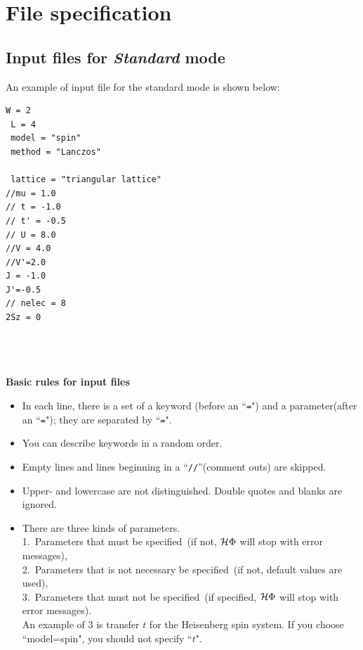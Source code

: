 \chapter{File specification}
\label{Ch:HowToStandard}
\section{Input files for {\it Standard} mode}

An example of input file for the standard mode is shown below:

\begin{minipage}{10cm}
\begin{screen}
\begin{verbatim}
W = 2
 L = 4
 model = "spin"
 method = "Lanczos"

 lattice = "triangular lattice"
//mu = 1.0
// t = -1.0
// t' = -0.5
// U = 8.0
//V = 4.0
//V'=2.0
J = -1.0
J'=-0.5
// nelec = 8
2Sz = 0
\end{verbatim}
\end{screen}
\end{minipage}
~\\
~\\
~\\
{\bf Basic rules for input files}
\begin{itemize}
\item In each line, there is a set of a keyword (before an ``\verb|=|") and a parameter(after an ``\verb|=|"); 
  they are separated by ``\verb|=|".
\item You can describe keywords in a random order.
\item Empty lines and lines beginning in a ``\verb|//|''(comment outs) are skipped.
\item Upper- and lowercase are not distinguished.
  Double quotes and blanks are ignored.
\item There are three kinds of parameters.\\ 
  1.~Parameters that must be specified~(if not, $\mathcal{H} \Phi$ will stop with error messages),\\ 
  2.~Parameters that is not necessary be specified~(if not, default values are used),\\
  3.~Parameters that must not be specified~(if specified, $\mathcal{H} \Phi$ will stop with error messages).\\
  An example of 3 is transfer $t$ for the Heisenberg spin system. 
  If you choose ``model=spin", you should not specify ``$t$".
\end{itemize}

